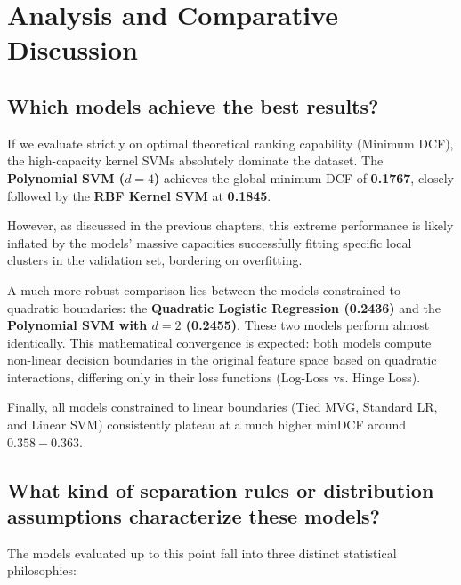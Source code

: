 \section{Analysis and Comparative Discussion}

\subsection*{Which models achieve the best results?}

If we evaluate strictly on optimal theoretical ranking capability (Minimum DCF), the high-capacity kernel SVMs absolutely dominate the dataset. The \textbf{Polynomial SVM ($d=4$)} achieves the global minimum DCF of \textbf{0.1767}, closely followed by the \textbf{RBF Kernel SVM} at \textbf{0.1845}. 

However, as discussed in the previous chapters, this extreme performance is likely inflated by the models' massive capacities successfully fitting specific local clusters in the validation set, bordering on overfitting.

A much more robust comparison lies between the models constrained to quadratic boundaries: the \textbf{Quadratic Logistic Regression (0.2436)} and the \textbf{Polynomial SVM with $d=2$ (0.2455)}. These two models perform almost identically. This mathematical convergence is expected: both models compute non-linear decision boundaries in the original feature space based on quadratic interactions, differing only in their loss functions (Log-Loss vs. Hinge Loss).

Finally, all models constrained to linear boundaries (Tied MVG, Standard LR, and Linear SVM) consistently plateau at a much higher minDCF around $0.358 - 0.363$. 

\subsection*{What kind of separation rules or distribution assumptions characterize these models?}

The models evaluated up to this point fall into three distinct statistical philosophies:

